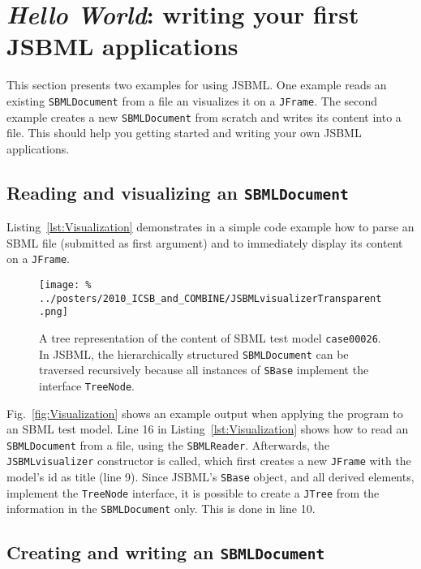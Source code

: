 \section{\emph{Hello World}: writing your first JSBML applications}

This section presents two examples for using JSBML. One example reads an
existing \texttt{SBMLDocument} from a file an visualizes it on a \texttt{JFrame}.
The second example creates a new \texttt{SBMLDocument} from scratch and writes
its content into a file. This should help you getting started and writing your
own JSBML applications.

\subsection{Reading and visualizing an \texttt{SBMLDocument}}

Listing~\vref{lst:Visualization} demonstrates in a simple code example how to
parse an SBML file (submitted as first argument) and to
immediately display its content on a \texttt{JFrame}.
%

\begin{SCfigure}[][h]
\texttt{[image: \%
../posters/2010\_ICSB\_and\_COMBINE/JSBMLvisualizerTransparent.png]}
\caption[Tree representation of an SBML file]{A tree representation of the
content of SBML test model \texttt{case00026}. In JSBML, the hierarchically
structured \texttt{SBMLDocument} can be traversed recursively because all
instances of \texttt{SBase} implement the interface \texttt{TreeNode}.}
\label{fig:Visualization}
\end{SCfigure}
Fig.~\vref{fig:Visualization} shows an example output when applying the program
to an SBML test model.
%
Line 16 in Listing~\vref{lst:Visualization} shows how to read an
\texttt{SBMLDocument} from a file, using the \texttt{SBMLReader}. Afterwards,
the \texttt{JSBMLvisualizer} constructor is called, which first creates a new
\texttt{JFrame} with the model's id as title (line 9). Since JSBML's
\texttt{SBase} object, and all derived elements, implement the \texttt{TreeNode}
interface, it is possible to create a \texttt{JTree} from the information in the
\texttt{SBMLDocument} only. This is done in line 10.

\subsection{Creating and writing an \texttt{SBMLDocument}}

